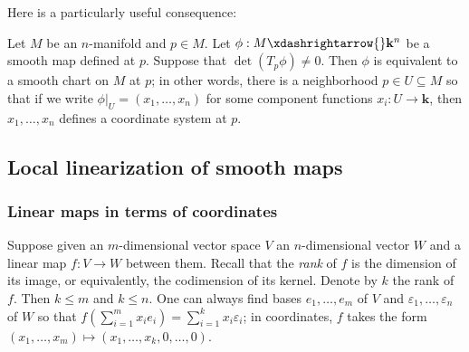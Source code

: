\documentclass[reqno]{amsart} 
\def\eps{\varepsilon}
\begin{document}
Here is a particularly useful consequence:
\begin{corollary}
  Let $M$ be an $n$-manifold
  and $p \in M$.
  Let $\phi : M \xdashrightarrow{} \mathbf{k}^n$
  be a smooth map defined at $p$.
  Suppose that $\det(T_p \phi) \neq 0$.
  Then $\phi$ is equivalent to a smooth chart on $M$ at $p$;
  in other words,
  there is a neighborhood $p \in U \subseteq M$
  so that
  if we write $\phi|_U = (x_1,\dotsc,x_n)$
  for some component functions $x_i : U \rightarrow \mathbf{k}$,
  then
  $x_1,\dotsc,x_n$ defines a coordinate system at $p$.
\end{corollary}

\subsection{Local linearization of smooth maps}
\label{sec:org7d02d39}
\subsubsection{Linear maps in terms of coordinates}
\label{sec:org7f15f91}
Suppose given an $m$-dimensional vector space $V$
an $n$-dimensional vector $W$ and a linear
map $f : V \rightarrow W$
between them.
Recall that the \emph{rank} of $f$ is
the dimension of its image, or equivalently,
the codimension of its kernel.
Denote by $k$ the rank of $f$.
Then $k \leq m$ and $k \leq n$.
One can always
find bases $e_1,\dotsc,e_m$ of $V$
and $\eps_1,\dotsc,\eps_n$ of $W$
so that
$f(\sum_{i=1}^m x_i e_i)
= \sum_{i=1}^k x_i \eps_i$;
in coordinates, $f$ takes the form
$(x_1,\dotsc,x_m) \mapsto (x_1,\dotsc,x_k,0,\dotsc,0)$.
\end{document}
